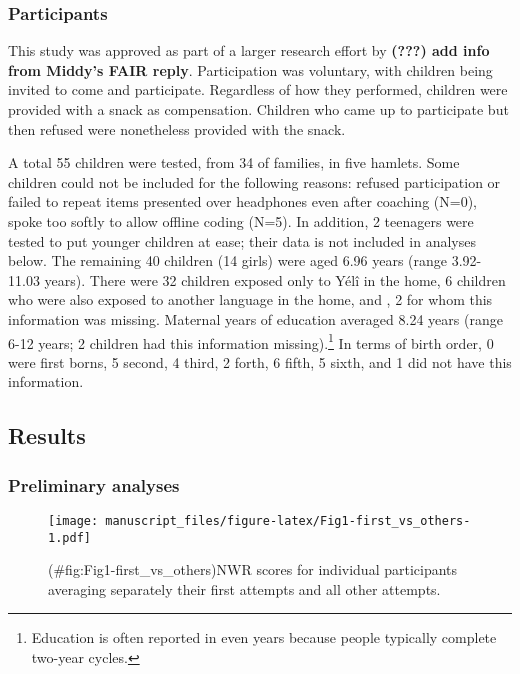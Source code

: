 \documentclass[english,,man,floatsintext]{apa6}
\begin{document}
\hypertarget{participants}{%
\subsubsection{Participants}\label{participants}}

This study was approved as part of a larger research effort by \textbf{({\textbf{???}}) add info from Middy's FAIR reply}. Participation was voluntary, with children being invited to come and participate. Regardless of how they performed, children were provided with a snack as compensation. Children who came up to participate but then refused were nonetheless provided with the snack.

A total 55 children were tested, from 34 of families, in five hamlets. Some children could not be included for the following reasons: refused participation or failed to repeat items presented over headphones even after coaching (N=0), spoke too softly to allow offline coding (N=5). In addition, 2 teenagers were tested to put younger children at ease; their data is not included in analyses below. The remaining 40 children (14 girls) were aged 6.96 years (range 3.92-11.03 years). There were 32 children exposed only to Yélî in the home, 6 children who were also exposed to another language in the home, and , 2 for whom this information was missing. Maternal years of education averaged 8.24 years (range 6-12 years; 2 children had this information missing).\footnote{Education is often reported in even years because people typically complete two-year cycles.} In terms of birth order, 0 were first borns, 5 second, 4 third, 2 forth, 6 fifth, 5 sixth, and 1 did not have this information.

\hypertarget{results}{%
\subsection{Results}\label{results}}

\hypertarget{preliminary-analyses}{%
\subsubsection{Preliminary analyses}\label{preliminary-analyses}}

\begin{figure}
\centering
\texttt{[image: manuscript\_files/figure-latex/Fig1-first\_vs\_others-1.pdf]}
\caption{(\#fig:Fig1-first\_vs\_others)NWR scores for individual participants averaging separately their first attempts and all other attempts.}
\end{figure}
\end{document}
